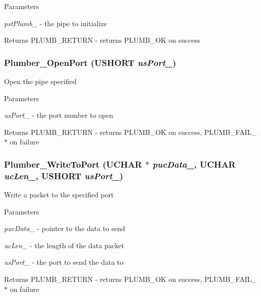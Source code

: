 \begin{DoxyParams}{Parameters}
\item[{\em pstPlumb\_\-}]-\/ the pipe to initialize \end{DoxyParams}
\begin{DoxyReturn}{Returns}
PLUMB\_\-RETURN -\/ returns PLUMB\_\-OK on success 
\end{DoxyReturn}
\subsubsection[{Plumber\_\-OpenPort}]{ Plumber\_\-OpenPort (USHORT {\em usPort\_\-})}\label{plumber_8c_a829e3f4d8ece685ef73d4c23232d1037}
Open the pipe specified


\begin{DoxyParams}{Parameters}
\item[{\em usPort\_\-}]-\/ the port number to open \end{DoxyParams}
\begin{DoxyReturn}{Returns}
PLUMB\_\-RETURN -\/ returns PLUMB\_\-OK on success, PLUMB\_\-FAIL\_\-$\ast$ on failure 
\end{DoxyReturn}
\subsubsection[{Plumber\_\-WriteToPort}]{ Plumber\_\-WriteToPort (UCHAR $\ast$ {\em pucData\_\-}, \/  UCHAR {\em ucLen\_\-}, \/  USHORT {\em usPort\_\-})}\label{plumber_8c_aa0d51bb1846a949a10ac39ba3ff21827}
Write a packet to the specified port


\begin{DoxyParams}{Parameters}
\item[{\em pucData\_\-}]-\/ pointer to the data to send \item[{\em ucLen\_\-}]-\/ the length of the data packet \item[{\em usPort\_\-}]-\/ the port to send the data to \end{DoxyParams}
\begin{DoxyReturn}{Returns}
PLUMB\_\-RETURN -\/ returns PLUMB\_\-OK on success, PLUMB\_\-FAIL\_\-$\ast$ on failure 
\end{DoxyReturn}
